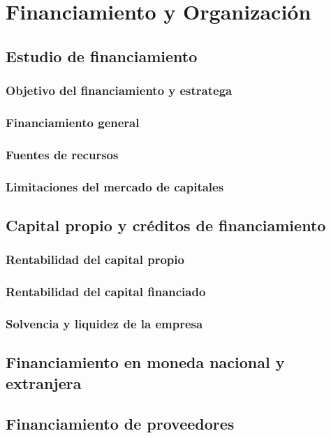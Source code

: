 \documentclass[crop=false]{standalone}
\begin{document}
\section{Financiamiento y Organización}


\subsection{Estudio de financiamiento}

\subsubsection{Objetivo del financiamiento y estratega}
\subsubsection{Financiamiento general}
\subsubsection{Fuentes de recursos}
\subsubsection{Limitaciones del mercado de capitales}

\subsection{Capital propio y créditos de financiamiento}
\subsubsection{Rentabilidad del capital propio}
\subsubsection{Rentabilidad del capital financiado}
\subsubsection{Solvencia y liquidez de la empresa}

\subsection{Financiamiento en moneda nacional y extranjera}

\subsection{Financiamiento de proveedores}
\end{document}
